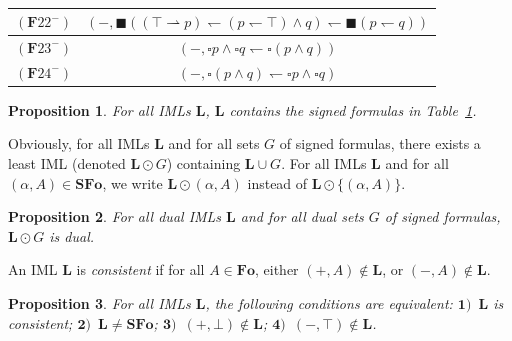 \documentclass[draft]{article}
\newtheorem{proposition}{Proposition}
\def\Formula{\mathbf{A}}
\def\Formula{\mathbf{F}}
\def\Fo{\mathbf{Fo}}
\def\SFo{\mathbf{SFo}}
\def\L{\mathbf{L}}
\begin{document}
\begin{table}[ht]
\begin{center}
\begin{tabular}{|c|c|}
%
%
\\
%
%
\hline
%
%
$(\Formula22^{-})$&$(-,{\blacksquare}(({\top}{\rightharpoonup}p){\leftharpoondown}(p{\leftharpoondown}{\top}){\wedge}q){\leftharpoondown}{\blacksquare}(p{\leftharpoondown}q))$
%
\\
%
%
\hline
%
%
$(\Formula23^{-})$&$(-,{\square}p{\wedge}{\square}q{\leftharpoondown}{\square}(p{\wedge}q))$
%
%
\\
%
%
\hline
%
%
$(\Formula24^{-})$&$(-,{\square}(p{\wedge}q){\leftharpoondown}{\square}p{\wedge}{\square}q)$
%
%
\\
%
%
\hline
%
%
\end{tabular}
%
%
\vspace{+0.25cm}
%
%
\caption{}\label{table:formulas:for:Proposition:for:all:formulas:and:and:1}
%
%
\end{center}
%
%
\end{table}
%
%
\vspace{-0.50cm}
%
%
\begin{proposition}\label{Proposition:for:all:formulas:and:and:2:axioms}
%
%
For all IMLs $\L$, $\L$ contains the signed formulas in Table~\ref{table:formulas:for:Proposition:for:all:formulas:and:and:1}.
%
%
\end{proposition}
%
%
%
%
Obviously, for all IMLs $\L$ and for all sets $G$ of signed formulas, there exists a least IML (denoted $\L{\odot}G$) containing $\L{\cup}G$.
%
%
%
%
For all IMLs $\L$ and for all $(\alpha,A){\in}\SFo$, we write $\L{\odot}(\alpha,A)$ instead of $\L{\odot}\{(\alpha,A)\}$.
%
%
%
%
\begin{proposition}\label{Proposition:about:dual:IML}
%
%
For all dual IMLs $\L$ and for all dual sets $G$ of signed formulas, $\L{\odot}G$ is dual.
%
%
\end{proposition}
%
%
An IML $\L$ is {\em consistent}\/ if for all $A{\in}\Fo$, either $(+,A){\not\in}\L$, or $(-,A){\not\in}\L$.
%
%
%
%
\begin{proposition}\label{Proposition:for:all:constructive:model:logics:the:following:conditions:are:equivalent:is:consistent}
%
%
For all IMLs $\L$, the following conditions are equivalent: $\mathbf{1)}$~$\L$ is consistent; $\mathbf{2)}$~$\L{\not=}\SFo$; $\mathbf{3)}$~$(+,{\bot}){\not\in}\L$; $\mathbf{4)}$~$(-,{\top}){\not\in}\L$.
%
%
\end{proposition}
%
%
\end{document}
